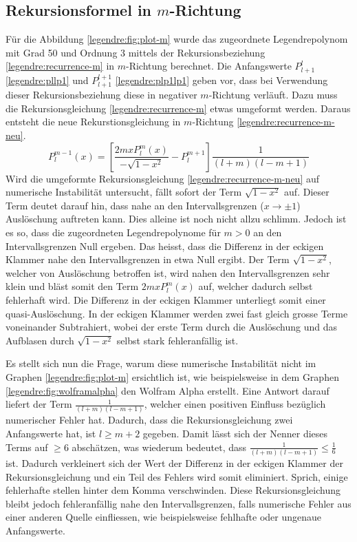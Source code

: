 \subsection{Rekursionsformel in $m$-Richtung
\label{legendre:subsection:mrichtung}}
Für die Abbildung \ref{legendre:fig:plot-m} wurde das zugeordnete Legendrepolynom mit Grad 50 und Ordnung 3 mittels der Rekursionsbeziehung \eqref{legendre:recurrence-m} in $m$-Richtung berechnet.
Die Anfangswerte $P^{l}_{l+1}$ \eqref{legendre:pllp1} und $P^{l+1}_{l+1}$ \eqref{legendre:plp1lp1} geben vor, dass bei Verwendung dieser Rekursionsbeziehung diese in negativer $m$-Richtung verläuft.
Dazu muss die Rekursionsgleichung \eqref{legendre:recurrence-m} etwas umgeformt werden.
Daraus entsteht die neue Rekurstionsgleichung in $m$-Richtung \eqref{legendre:recurrence-m-neu}.
\begin{equation}
P^{m-1}_{l}(x)
= \left[ \frac{2mxP^{m}_{l}(x)}{- \sqrt{1-x^2}}-P^{m+1}_{l} \right]
\frac{1}{(l+m)(l-m+1)}
\label{legendre:recurrence-m-neu}
\end{equation}
Wird die umgeformte Rekursionsgleichung \eqref{legendre:recurrence-m-neu} auf numerische Instabilität untersucht, fällt sofort der Term $\sqrt{1-x^2}$ auf.
Dieser Term deutet darauf hin, dass nahe an den Intervallsgrenzen ($x \rightarrow \pm 1$) Auslöschung auftreten kann.
Dies alleine ist noch nicht allzu schlimm.
Jedoch ist es so, dass die zugeordneten Legendrepolynome für $m>0$ an den Intervallsgrenzen Null ergeben.
Das heisst, dass die Differenz in der eckigen Klammer nahe den Intervallsgrenzen in etwa Null ergibt.
Der Term $\sqrt{1-x^2}$, welcher von Auslöschung betroffen ist, wird nahen den Intervallsgrenzen sehr klein und bläst somit den Term $2mxP^{m}_{l}(x)$ auf, welcher dadurch selbst fehlerhaft wird.
Die Differenz in der eckigen Klammer unterliegt somit einer quasi-Auslöschung.
In der eckigen Klammer werden zwei fast gleich grosse Terme voneinander Subtrahiert, wobei der erste Term durch die Auslöschung und das Aufblasen durch $\sqrt{1-x^2}$ selbst stark fehleranfällig ist.

Es stellt sich nun die Frage, warum diese numerische Instabilität nicht im Graphen \ref{legendre:fig:plot-m} ersichtlich ist, wie beispielsweise in dem Graphen \ref{legendre:fig:wolframalpha} den Wolfram Alpha erstellt.
Eine Antwort darauf liefert der Term $\frac{1}{(l+m)(l-m+1)}$, welcher einen positiven Einfluss bezüglich numerischer Fehler hat.
Dadurch, dass die Rekursionsgleichung zwei Anfangswerte hat, ist $l\geq m+2$ gegeben.
Damit lässt sich der Nenner dieses Terms auf $\geq 6$ abschätzen, was wiederum bedeutet, dass $\frac{1}{(l+m)(l-m+1)} \leq \frac{1}{6}$ ist.
Dadurch verkleinert sich der Wert der Differenz in der eckigen Klammer der Rekursionsgleichung und ein Teil des Fehlers wird somit eliminiert.
Sprich, einige fehlerhafte stellen hinter dem Komma verschwinden.
Diese Rekursionsgleichung bleibt jedoch fehleranfällig nahe den Intervallsgrenzen, falls numerische Fehler aus einer anderen Quelle einfliessen, wie beispielsweise fehlhafte oder ungenaue Anfangswerte.

